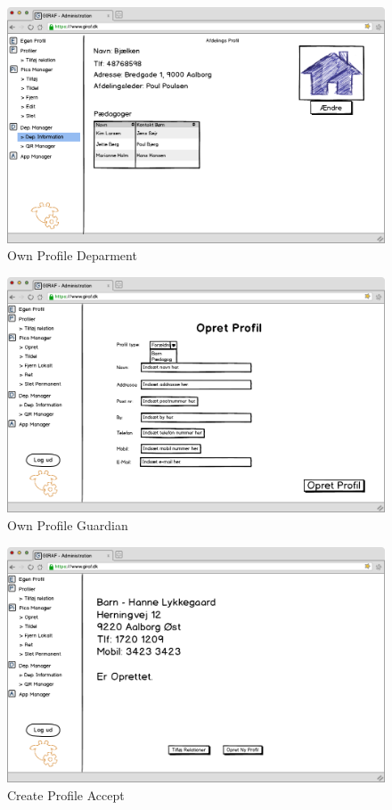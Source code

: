 \newpage

\begin{figure}[p]
\centering
\includegraphics[width=14cm]{images/mockup/egenProfilDepartment.png}
\caption{Own Profile Deparment}
\label{fig:own_profile_department}
\end{figure}

\begin{figure}[p]
\centering
\includegraphics[width=14cm]{images/mockup/egenProfilGaudiens.png}
\caption{Own Profile Guardian}
\label{fig:own_profile_guardian}
\end{figure}

\newpage

\begin{figure}[p]
\centering
\includegraphics[width=14cm]{images/mockup/opretProfilAccept.png}
\caption{Create Profile Accept}
\label{fig:create_profile_accept}
\end{figure}



